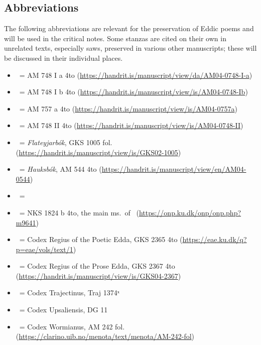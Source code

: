 \subsection{Abbreviations}

The following abbreviations are relevant for the preservation of Eddic poems and will be used in the critical notes.  Some stanzas are cited on their own in unrelated texts, especially saws, preserved in various other manuscripts; these will be discussed in their individual places.

\begin{itemize}%
	\item \AM\ = AM 748 I a 4to (\url{https://handrit.is/manuscript/view/da/AM04-0748-I-a})
  \item \AMb\ = AM 748 I b 4to (\url{https://handrit.is/manuscript/view/is/AM04-0748-Ib})
  \item \EddaBms\ = AM 757 a 4to (\url{https://handrit.is/manuscript/view/is/AM04-0757a})
  \item \EddaCms\ = AM 748 II 4to (\url{https://handrit.is/manuscript/view/is/AM04-0748-II})
	\item \FlatMS\ = \emph{Flateyjarbók}, GKS 1005 fol. (\url{https://handrit.is/manuscript/view/is/GKS02-1005})
	\item \Hauksbok\ = \emph{Hauksbók}, AM 544 4to (\url{https://handrit.is/manuscript/view/en/AM04-0544})
  \item \GylfMS\ = \RegiusProse\Trajectinus\Wormianus\Upsaliensis
	\item \VolsungaMS\ = NKS 1824 b 4to, the main ms.~of \VolsungaSaga\ (\url{https://onp.ku.dk/onp/onp.php?m9641})
	\item \Regius\ = Codex Regius of the Poetic Edda, GKS 2365 4to (\url{https://eae.ku.dk/q?p=eae/vols/text/1})
	\item \RegiusProse\ = Codex Regius of the Prose Edda, GKS 2367 4to (\url{https://handrit.is/manuscript/view/is/GKS04-2367})
	\item \Trajectinus\ = Codex Trajectinus, Traj 1374ˣ
	\item \Upsaliensis\ = Codex Upsaliensis, DG 11
	\item \Wormianus\ = Codex Wormianus, AM 242 fol. (\url{https://clarino.uib.no/menota/text/menota/AM-242-fol})
\end{itemize}
